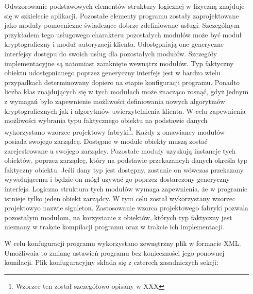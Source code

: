 
Odwzorowanie podstawowych elementów struktury logicznej w fizyczną
znajduje się w szkielecie aplikacji. Pozostałe elementy programu
zostały zaprojektowane jako moduły pomocniczne świadczące dobrze
zdefiniowane usługi.  Szczególnym przykładem tego usługowego
charakteru pozostałych modułów może być moduł kryptograficzny i moduł
autoryzacji klienta. Udostępniają one generyczne interfejsy dostępu do
swoich usług dla pozostałych modułów. Szczegóły implementacyjne są
natomiast zamknięte wewnątrz modułów. Typ faktyczny obiektu
udostępnianego poprzez generyczny interfejs jest w bardzo wielu
przypadkach determinowany dopiero na etapie konfiguracji
programu. Ponadto liczba klas znajdujących się w tych modułach może
znacząco rosnąć, gdyż jednym z wymagań było zapewnienie możliwości
definiowania nowych algorytmów kryptograficznych jak i algorytmów
uwierzytelnienia klienta. W celu zapewnienia możliwości wybrania typu
faktycznego obiektu na podstawie danych wykorzystano wzorzec
projektowy fabryki\footnote{Wzorzec ten został szczegółowo opisany w
  XXX}.  Każdy z omawiancy modułów posiada swojego zarządcę. Dostępne
w module obiekty muszą zostać zarejestrowane u swojego
zarządcy. Pozostałe moduły uzyskują instancje tych obiektów, poprzez
zarządcę, który na podstawie przekazancyh danych określa typ faktyczny
obiektu. Jeśli dany typ jest dostępny, zostanie on wówczas przekazany
wywołującemu i będzie on mógł uzywać go poprzez dostarczony generyczny
interfejs. Logiczna struktura tych modułów wymaga zapewnienia, że w
programie istnieje tylko jeden obiekt zarządcy. W tym celu został
wykorzystany wzorzec projektowyo nazwie signleton.  Zastosowanie
wzorca projektowego fabryki pozwala pozostałym modułom, na korzystanie
z obiektów, których typ faktyczny jest nieznany w trakcie kompilacji
programu oraz w trakcie ich implementacji. 

W celu konfuguracji programu wykorzystano zewnętrzny plik w formacie
XML. Umożliwaia to zmianę ustawień programu bez konieczności jego
ponownej komilacji. Plik konfuguracyjny składa się z czterech zasadniczych sekcji:

